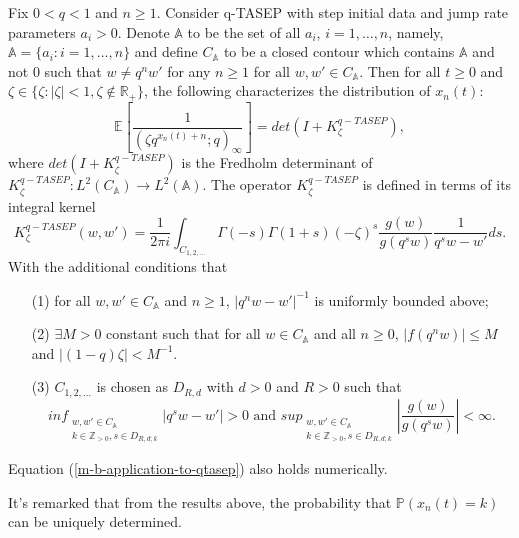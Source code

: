 \begin{theorem}
\label{mbmb-application-to-qtasep}
Fix $0 < q < 1$ and $n \ge 1$. Consider q-TASEP with step initial data and jump rate parameters $a_i > 0$. Denote $\mathbb{A}$ to be the set of all $a_i$, $i = 1, \dots, n$, namely, $\mathbb{A} = \{a_i: i = 1, \dots, n\}$ and define $C_{\mathbb{A}}$ to be a closed contour which contains $\mathbb{A}$ and not $0$ such that $w \neq q^n w'$ for any $n \ge 1$ for all $w, w' \in C_{\mathbb{A}}$. Then for all $t \ge 0$ and $\zeta \in \{\zeta: |\zeta| < 1, \zeta \notin \mathbb{R}_+\}$, the following characterizes the distribution of $x_n(t)$:
\begin{equation}
\label{m-b-application-to-qtasep}
\mathbb{E} \left[ \frac{1}{(\zeta q^{x_n(t)+n}; q)_{\infty}} \right] = det(I+K_{\zeta}^{q-TASEP}),
\end{equation}
where $det(I+K_{\zeta}^{q-TASEP})$ is the Fredholm determinant of $K_{\zeta}^{q-TASEP}: L^2(C_{\mathbb{A}}) \rightarrow L^2(\mathbb{A})$. The operator $K_{\zeta}^{q-TASEP}$ is defined in terms of its integral kernel
$$K_{\zeta}^{q-TASEP}(w,w') = \frac{1}{2 \pi i} \int_{C_{1,2,\dots}} \Gamma(-s) \Gamma(1+s) (-\zeta)^s \frac{g(w)}{g(q^sw)} \frac{1}{q^sw - w'} ds.$$
With the additional conditions that
\begin{enumerate}
\item[(1)] for all $w, w' \in C_{\mathbb{A}}$ and $n \ge 1$, $|q^n w - w'|^{-1}$ is uniformly bounded above;
\item[(2)] $\exists M > 0$ constant such that for all $w \in C_{\mathbb{A}}$ and all $n \ge 0$, $|f(q^n w)| \le M$ and $|(1-q) \zeta| < M^{-1}$.
\item[(3)] $C_{1,2,\dots}$ is chosen as $D_{R,d}$ with $d > 0$ and $R > 0$ such that $$ inf_{\substack{ {w, w' \in C_{\mathbb{A}}} \\ {k \in \mathbb{Z}_{>0}, s \in D_{R, d;k}} }} |q^sw - w'| > 0 \text{ and } sup_{\substack{ {w,w' \in C_{\mathbb{A}}} \\ {k \in \mathbb{Z}_{>0}, s \in D_{R,d;k}} }} \left| \frac{g(w)}{g(q^s w)} \right| < \infty.$$
\end{enumerate}
Equation (\ref{m-b-application-to-qtasep}) also holds numerically.
\end{theorem}

\begin{remark}
It's remarked that from the results above, the probability that $\mathbb{P}(x_n(t) = k)$ can be uniquely determined.
\end{remark}

